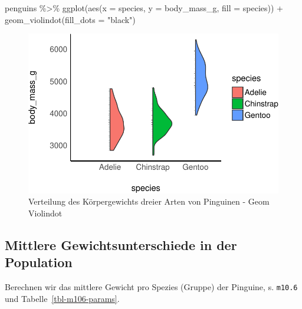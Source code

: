 \documentclass[
  a4paper,
  DIV=11]{scrreprt}
\newenvironment{Shaded}{\begin{snugshade}}{\end{snugshade}}
\newcommand{\AttributeTok}[1]{\textcolor[rgb]{0.40,0.45,0.13}{#1}}
\newcommand{\FunctionTok}[1]{\textcolor[rgb]{0.28,0.35,0.67}{#1}}
\newcommand{\NormalTok}[1]{\textcolor[rgb]{0.00,0.23,0.31}{#1}}
\newcommand{\SpecialCharTok}[1]{\textcolor[rgb]{0.37,0.37,0.37}{#1}}
\newcommand{\StringTok}[1]{\textcolor[rgb]{0.13,0.47,0.30}{#1}}
\theoremstyle{definition}
\theoremstyle{remark}
\begin{document}
\begin{Shaded}
\begin{Highlighting}[]
\NormalTok{penguins }\SpecialCharTok{\%\textgreater{}\%} 
  \FunctionTok{ggplot}\NormalTok{(}\FunctionTok{aes}\NormalTok{(}\AttributeTok{x =}\NormalTok{ species, }\AttributeTok{y =}\NormalTok{ body\_mass\_g, }\AttributeTok{fill =}\NormalTok{ species)) }\SpecialCharTok{+}
  \FunctionTok{geom\_violindot}\NormalTok{(}\AttributeTok{fill\_dots =} \StringTok{"black"}\NormalTok{)}
\end{Highlighting}
\end{Shaded}

\begin{figure}[H]

{\centering \includegraphics{./metrische-AV_files/figure-pdf/fig-penguines3-1.pdf}

}

\caption{\label{fig-penguines3}Verteilung des Körpergewichts dreier
Arten von Pinguinen - Geom Violindot}

\end{figure}

\hypertarget{mittlere-gewichtsunterschiede-in-der-population}{%
\subsection{Mittlere Gewichtsunterschiede in der
Population}\label{mittlere-gewichtsunterschiede-in-der-population}}

Berechnen wir das mittlere Gewicht pro Spezies (Gruppe) der Pinguine, s.
\texttt{m10.6} und Tabelle~\ref{tbl-m106-params}.
\end{document}
